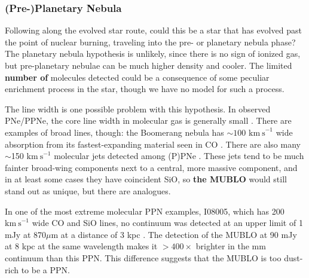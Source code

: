 \documentclass[]{aastex631}
\newcommand{\msun}{\ensuremath{\mathrm{M}_\odot}\xspace}
\newcommand{\kms}{\ensuremath{\mathrm{km~s}^{-1}}\xspace}
\def\rr#1{\textbf{#1}}
\begin{document}
\subsubsection{(Pre-)Planetary Nebula}
Following along the evolved star route, could this be a star that has evolved past the point of nuclear burning, traveling into the pre- or planetary nebula phase?
The planetary nebula hypothesis is unlikely, since there is no sign of ionized gas, but pre-planetary nebulae can be much higher density and cooler.
The limited \rr{number of} molecules detected could be a consequence of some peculiar enrichment process in the star, though we have no model for such a process.


The line width is one possible problem with this hypothesis.
In observed PNe/PPNe, the core line width in molecular gas is generally small \citep[e.g., CRL 618 has widths $\sim15$ \kms;][]{Lee2013a,Lee2013b}.
There are examples of broad lines, though: the Boomerang nebula has $\sim100$ \kms wide absorption from its fastest-expanding material seen in CO \citep{Sahai2017}.
There are also many $\sim$150 \kms molecular jets detected among (P)PNe \citep{Guerrero2020,Sahai2015}.
These jets tend to be much fainter broad-wing components next to a central, more massive component, and in at least some cases they have coincident SiO, so \rr{the MUBLO} would still stand out as unique, but there are analogues.

In one of the most extreme molecular PPN examples, I08005,  which has 200 \kms wide CO and SiO lines, no continuum was detected at an upper limit of 1 mJy at 870$\mu$m at a distance of 3 kpc \citep{Sahai2015}.
The detection of the MUBLO at 90 mJy at 8 kpc at the same wavelength makes it $>400\times$ brighter in the mm continuum than this PPN.
This difference suggests that the MUBLO is too dust-rich to be a PPN.
    
\end{document}

